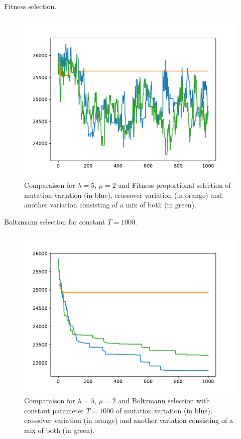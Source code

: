 \documentclass{beamer}
\begin{document}
\begin{frame}
	Fitness selection.
\begin{figure}
\centering
\includegraphics[scale=.5]{../Plots/new/5,2,mutcmul,fitness.pdf}
\caption{Comparaison for $\lambda = 5$, $\mu = 2$ and Fitness proportional
selection of mutation variation (in blue), crossover variation (in orange) and
another variation consisting of a mix of both (in green).}
\label{Fitnesscomparevariation}
\end{figure}
\end{frame}

\begin{frame}
	Boltzmann selection for constant $T = 1000$.
\begin{figure}
\centering
\includegraphics[scale=.5]{../Plots/new/5,2,mutcmul,Boltzmann1000.pdf}
\caption{Comparaison for $\lambda = 5$, $\mu = 2$ and Boltzmann selection with
constant parameter $T = 1000$ of mutation variation (in blue), crossover
variation (in orange) and another variation consisting of a mix of both (in
green).}
\label{Boltzmanncomparevariation}
\end{figure}
\end{frame}
\end{document}
